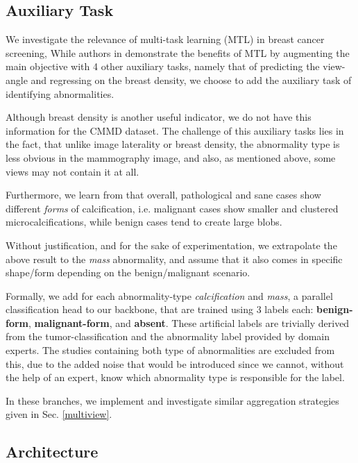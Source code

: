 \documentclass[11pt]{article}
\begin{document}
\subsection{Auxiliary Task}
\label{sec:org4a75870}

We investigate the relevance of multi-task learning (MTL) in breast cancer screening,
While authors in \autocite{tardy22} demonstrate the benefits of MTL
by augmenting the main objective with
4 other auxiliary tasks, namely that of predicting the view-angle and
regressing on the breast density,
we choose to add the auxiliary task of identifying abnormalities.

Although breast density is another useful indicator, we do not have this information for the CMMD dataset. The challenge of this auxiliary tasks lies in the fact, that unlike image laterality or breast density, the abnormality type is less obvious in the mammography image, and also, as mentioned above, some views may not contain it at all.

Furthermore, we learn from \autocite{azam21} that overall, pathological and sane
cases show different \emph{forms} of calcification, i.e. malignant cases show smaller and clustered
microcalcifications, while benign cases tend to create large blobs.

Without justification, and for the sake of experimentation,
we extrapolate the above result to the \emph{mass} abnormality, and assume
that it also comes in specific shape/form depending on the benign/malignant
scenario.

Formally, we add for each abnormality-type \emph{calcification} and \emph{mass},
a parallel classification head to our backbone, that are trained using
3 labels each: \textbf{benign-form}, \textbf{malignant-form}, and \textbf{absent}.
These artificial labels are trivially derived from the tumor-classification and
the abnormality label provided by domain experts.
The studies containing both type of abnormalities are excluded from this, due to the added noise that would be introduced since we cannot, without the help of an expert, know which abnormality type is responsible for the label.

In these branches, we implement and investigate similar aggregation strategies
given in Sec. \ref{multiview}.

\subsection{Architecture}
\label{sec:org53b1c82}
\end{document}
